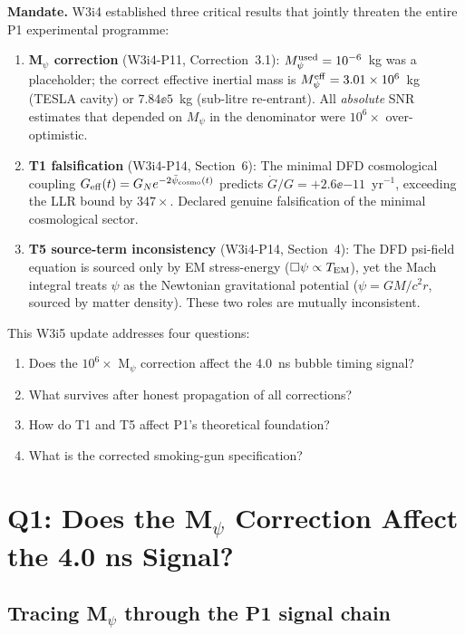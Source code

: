 \noindent\textbf{Mandate.}
W3i4 established three critical results that jointly threaten the entire
P1 experimental programme:
\begin{enumerate}[nosep]
\item \textbf{M$_\psi$ correction} (W3i4-P11, Correction~3.1):
  $M_\psi^{\rm used} = 10^{-6}$~kg was a placeholder; the correct effective inertial
  mass is $M_\psi^{\rm eff} = 3.01\times 10^{6}$~kg (TESLA cavity) or
  $7.84\ee{5}$~kg (sub-litre re-entrant). All \emph{absolute} SNR estimates
  that depended on $M_\psi$ in the denominator were $10^6\times$
  over-optimistic.
\item \textbf{T1 falsification} (W3i4-P14, Section~6): The minimal DFD
  cosmological coupling $G_{\rm eff}(t) = G_N e^{-2\bar{\psi}_{\rm cosmo}(t)}$ predicts
  $\dot{G}/G = +2.6\ee{-11}$~yr$^{-1}$, exceeding the LLR bound by
  $347\times$. Declared genuine falsification of the minimal cosmological
  sector.
\item \textbf{T5 source-term inconsistency} (W3i4-P14, Section~4): The DFD
  psi-field equation is sourced only by EM stress-energy
  ($\Box\psi \propto T_{\rm EM}$), yet the Mach integral treats $\psi$ as the
  Newtonian gravitational potential ($\psi = GM/c^2 r$, sourced by matter
  density). These two roles are mutually inconsistent.
\end{enumerate}

This W3i5 update addresses four questions:
\begin{enumerate}[nosep,label=\textbf{Q\arabic*.}]
\item Does the $10^{6}\times$ M$_\psi$ correction affect the 4.0~ns bubble
  timing signal?
\item What survives after honest propagation of all corrections?
\item How do T1 and T5 affect P1's theoretical foundation?
\item What is the corrected smoking-gun specification?
\end{enumerate}

\section{Q1: Does the M$_\psi$ Correction Affect the 4.0 ns Signal?}
\label{sec:mpsi_propagation}

\subsection{Tracing M$_\psi$ through the P1 signal chain}
\label{ssec:mpsi_trace}

